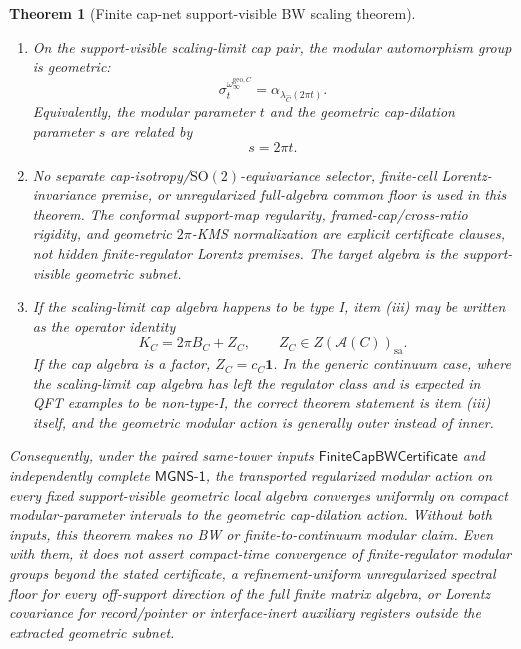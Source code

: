 \documentclass[11pt]{article}
\newtheorem{theorem}{Theorem}[section]
\begin{document}
\begin{theorem}[Finite cap-net support-visible BW scaling theorem]
\begin{enumerate}[label=\textup{(\roman*)},leftmargin=2em]
\item On the support-visible scaling-limit cap pair, the modular automorphism group is geometric:
\[
\sigma_t^{\omega_\infty^{\mathrm{geo},C}}
=
\alpha_{\lambda_{\widehat C}(2\pi t)}.
\]
Equivalently, the modular parameter \(t\) and the geometric cap-dilation parameter \(s\) are related by
\[
s=2\pi t.
\]

\item No separate cap-isotropy/\(\mathrm{SO}(2)\)-equivariance selector, finite-cell Lorentz-invariance premise, or unregularized full-algebra common floor is used in this theorem. The conformal support-map regularity, framed-cap/cross-ratio rigidity, and geometric \(2\pi\)-KMS normalization are explicit certificate clauses, not hidden finite-regulator Lorentz premises. The target algebra is the support-visible geometric subnet.

\item If the scaling-limit cap algebra happens to be type I, item \textup{(iii)} may be written as the operator identity
\[
K_C=2\pi B_C+Z_C,\qquad Z_C\in Z(\mathcal A(C))_{\mathrm{sa}}.
\]
If the cap algebra is a factor, \(Z_C=c_C\mathbf1\). In the generic continuum case, where the scaling-limit cap algebra has left the regulator class and is expected in QFT examples to be non-type-I, the correct theorem statement is item \textup{(iii)} itself, and the geometric modular action is generally outer instead of inner.
\end{enumerate}

Consequently, under the paired same-tower inputs
\(\mathsf{FiniteCapBWCertificate}\) and independently complete
\(\mathsf{MGNS\text{-}1}\), the transported regularized modular
action on every fixed support-visible geometric local algebra converges uniformly on compact
modular-parameter intervals to the geometric cap-dilation action. Without both inputs, this theorem
makes no BW or finite-to-continuum modular claim. Even with them, it does not assert compact-time
convergence of finite-regulator modular groups beyond the stated certificate, a refinement-uniform unregularized spectral floor
for every off-support direction of the full finite matrix algebra, or Lorentz covariance for
record/pointer or interface-inert auxiliary registers outside the extracted geometric subnet.
\end{theorem}
\end{document}

